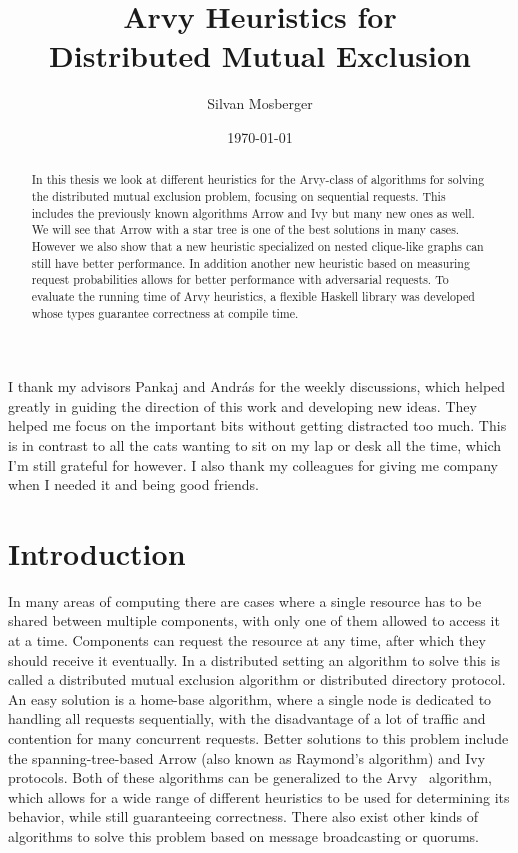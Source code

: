 \documentclass[a4paper, oneside]{discothesis}
\title{Arvy Heuristics for \\Distributed Mutual Exclusion}
\author{Silvan Mosberger}
\institute{Distributed Computing Group \\[2pt]
Computer Engineering and Networks Laboratory \\[2pt]
ETH Zürich}
\date{\today}
\begin{document}
\frontmatter
\maketitle

\cleardoublepage

\begin{acknowledgements}
I thank my advisors Pankaj and András for the weekly discussions, which helped greatly in guiding the direction of this work and developing new ideas. They helped me focus on the important bits without getting distracted too much. This is in contrast to all the cats wanting to sit on my lap or desk all the time, which I'm still grateful for however. I also thank my colleagues for giving me company when I needed it and being good friends.
\end{acknowledgements}


\begin{abstract}
In this thesis we look at different heuristics for the Arvy-class of algorithms for solving the distributed mutual exclusion problem, focusing on sequential requests. This includes the previously known algorithms Arrow and Ivy but many new ones as well. We will see that Arrow with a star tree is one of the best solutions in many cases. However we also show that a new heuristic specialized on nested clique-like graphs can still have better performance. In addition another new heuristic based on measuring request probabilities allows for better performance with adversarial requests. To evaluate the running time of Arvy heuristics, a flexible Haskell library was developed whose types guarantee correctness at compile time.
\end{abstract}

\tableofcontents

\mainmatter

\chapter{Introduction}

In many areas of computing there are cases where a single resource has to be shared between multiple components, with only one of them allowed to access it at a time. Components can request the resource at any time, after which they should receive it eventually. In a distributed setting an algorithm to solve this is called a distributed mutual exclusion algorithm or distributed directory protocol. An easy solution is a home-base algorithm, where a single node is dedicated to handling all requests sequentially, with the disadvantage of a lot of traffic and contention for many concurrent requests. Better solutions to this problem include the spanning-tree-based Arrow (also known as Raymond's algorithm) and Ivy protocols. Both of these algorithms can be generalized to the Arvy~\cite{Arvy} algorithm, which allows for a wide range of different heuristics to be used for determining its behavior, while still guaranteeing correctness. There also exist other kinds of algorithms to solve this problem based on message broadcasting or quorums.
\end{document}

